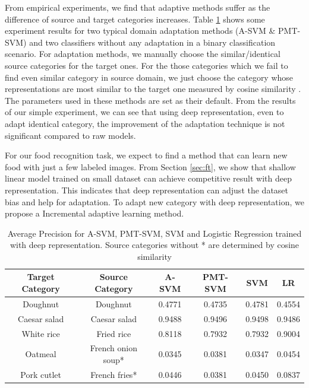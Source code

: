 From empirical experiments, we find that adaptive methods suffer as the difference of source and target categories increases. Table \ref{tab:su_domian} shows some experiment results for two typical domain adaptation methods (A-SVM \& PMT-SVM) and two classifiers without any adaptation in a binary classification scenario. For adaptation methods, we manually choose the similar/identical source categories for the target ones. For the those categories which we fail to find even similar category in source domain, we just choose the category whose representations are most similar to the target one measured by cosine similarity \cite{aytar2011tabula}. The parameters used in these methods are set as their default. From the results of our simple experiment, we can see that using deep representation, even to adapt identical category, the improvement of the adaptation technique is not significant compared to raw models.

For our food recognition task, we expect to find a method that can learn new food with just a few labeled images. From Section \ref{sec:ft}, we show that shallow linear model trained on small dataset can achieve competitive result with deep representation. This indicates that deep representation can adjust the dataset bias and help for adaptation. To adapt new category with deep representation, we propose a Incremental adaptive learning method.
\begin{table}[htbp]
  \centering
  \caption{Average Precision for A-SVM, PMT-SVM, SVM and Logistic Regression trained with deep representation. Source categories without * are determined by cosine similarity}
    \begin{tabular}{cccccc}
    \toprule
    Target Category & Source Category & A-SVM  & PMT-SVM & SVM &LR\\
    \midrule
    Doughnut & Doughnut & 0.4771 & 0.4735 &0.4781&0.4554\\
    Caesar salad &  Caesar salad & 0.9488 & 0.9496 &0.9498&0.9486\\
    White rice  & Fried rice & 0.8118 & 0.7932 &0.7932&0.9004\\
    Oatmeal & French onion soup* & 0.0345 & 0.0381 & 0.0347 &0.0454\\
    Pork cutlet & French fries* & 0.0446 & 0.0381 &0.0450& 0.0837\\
    \bottomrule
    \end{tabular}%
  \label{tab:su_domian}%
\end{table}%

